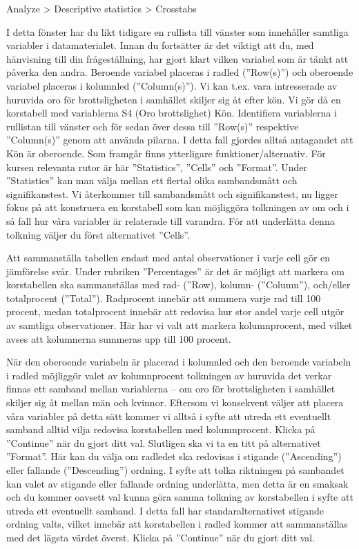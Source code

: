 \documentclass[
]{book}
\begin{document}
Analyze \textgreater{} Descriptive statistics \textgreater{} Crosstabs

I detta fönster har du likt tidigare en rullista till vänster som innehåller samtliga variabler i
datamaterialet. Innan du fortsätter är det viktigt att du, med hänvisning till din frågeställning, har gjort klart vilken variabel som är tänkt att påverka den andra. Beroende variabel placeras i radled (''Row(s)'') och oberoende variabel placeras i kolumnled (''Column(s)''). Vi kan t.ex. vara intresserade av huruvida oro för brottsligheten i samhället skiljer sig åt efter kön. Vi gör då en korstabell med variablerna S4 (Oro brottslighet) Kön. Identifiera variablerna i rullistan till vänster och för sedan över dessa till ''Row(s)'' respektive ''Column(s)'' genom att använda pilarna. I detta fall gjordes alltså antagandet att Kön är
oberoende. Som framgår finns ytterligare funktioner/alternativ. För kursen relevanta rutor är här
''Statistics'', ''Cells'' och ''Format''. Under ''Statistics'' kan man välja mellan ett flertal olika
sambandsmått och signifikanstest. Vi återkommer till sambandsmått och signifikanstest, nu ligger
fokus på att konstruera en korstabell som kan möjliggöra tolkningen av om och i så fall hur våra
variabler är relaterade till varandra. För att underlätta denna tolkning väljer du först alternativet
''Cells''.

Att sammanställa tabellen endast med antal observationer i varje cell gör en jämförelse svår. Under
rubriken ''Percentages'' är det är möjligt att markera om korstabellen ska sammanställas med rad-
(''Row), kolumn- (''Column''), och/eller totalprocent (''Total''). Radprocent innebär att summera
varje rad till 100 procent, medan totalprocent innebär att redovisa hur stor andel varje cell utgör av
samtliga observationer. Här har vi valt att markera kolumnprocent, med vilket avses att kolumnerna
summeras upp till 100 procent.

När den oberoende variabeln är placerad i kolumnled och den beroende variabeln i radled möjliggör
valet av kolumnprocent tolkningen av huruvida det verkar finnas ett samband mellan variablerna --
om oro för brottsligheten i samhället skiljer sig åt mellan män och kvinnor. Eftersom vi konsekvent
väljer att placera våra variabler på detta sätt kommer vi alltså i syfte att utreda ett eventuellt samband
alltid vilja redovisa korstabellen med kolumnprocent. Klicka på ''Continue'' när du gjort ditt val.
Slutligen ska vi ta en titt på alternativet ''Format''. Här kan du välja om radledet ska redovisas i stigande
(''Ascending'') eller fallande (''Descending'') ordning. I syfte att tolka riktningen på sambandet kan valet
av stigande eller fallande ordning underlätta, men detta är en smaksak och du kommer oavsett val
kunna göra samma tolkning av korstabellen i syfte att utreda ett eventuellt samband. I detta fall har
standaralternativet stigande ordning valts, vilket innebär att korstabellen i radled kommer att
sammanställas med det lägsta värdet överst. Klicka på ''Continue'' när du gjort ditt val.
\end{document}
